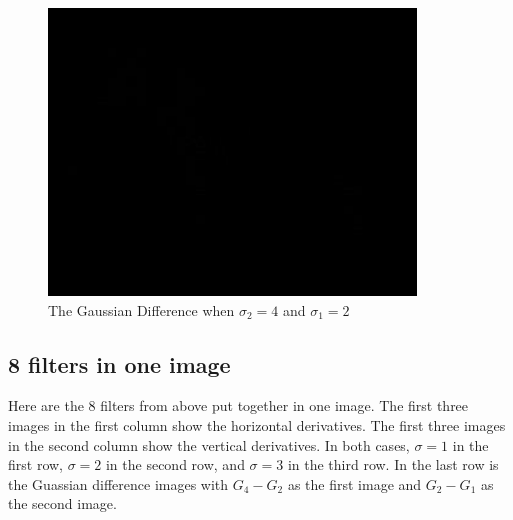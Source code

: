 \documentclass[11pt,psfig]{article}
\begin{document}
\begin{figure}[H]
\centering
\includegraphics[height=3in]{sigma2_4_sigma1_2_gaussDiff_zebra_small.jpg}
\caption{The Gaussian Difference when $\sigma_2=4$ and $\sigma_1=2$}
\end{figure}

\subsection*{8 filters in one image}

Here are the 8 filters from above put together in one image. The first three images in the first column show the horizontal derivatives. The first three images in the second column show the vertical derivatives. In both cases, $\sigma=1$ in the first row, $\sigma=2$ in the second row, and $\sigma=3$ in the third row. In the last row is the Guassian difference images with $G_4-G_2$ as the first image and $G_2-G_1$ as the second image.
\end{document}
